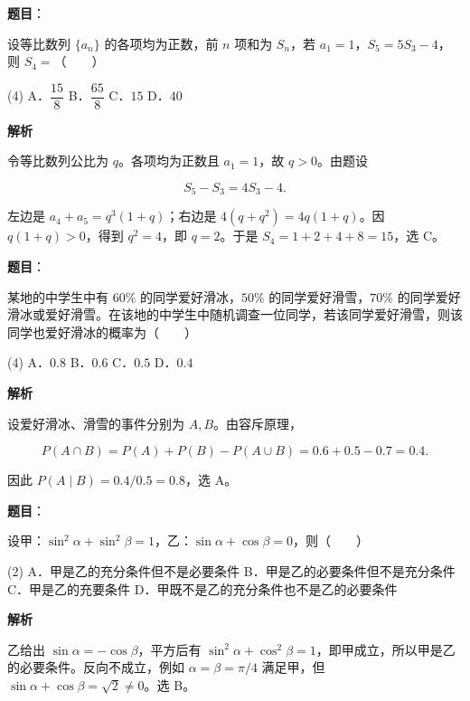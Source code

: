 \begin{answer}

\textbf{题目}：

设等比数列 $\{a_n\}$ 的各项均为正数，前 $n$ 项和为 $S_n$，若 $a_1=1$，$S_5=5S_3-4$，则 $S_4=$\mbox{（　　）}

\begin{gkopts}(4)
\task A．$\dfrac{15}{8}$
\task B．$\dfrac{65}{8}$
\task C．$15$
\task D．$40$
\end{gkopts}

\textbf{解析}

令等比数列公比为 $q$。各项均为正数且 $a_1=1$，故 $q>0$。由题设

\nopagebreak[4]
\[
S_5-S_3=4S_3-4.
\]

左边是 $a_4+a_5=q^3(1+q)$；右边是 $4(q+q^2)=4q(1+q)$。因 $q(1+q)>0$，得到 $q^2=4$，即 $q=2$。于是 $S_4=1+2+4+8=15$，选 C。


\end{answer}
\begin{answer}

\textbf{题目}：

某地的中学生中有 $60\%$ 的同学爱好滑冰，$50\%$ 的同学爱好滑雪，$70\%$ 的同学爱好滑冰或爱好滑雪。在该地的中学生中随机调查一位同学，若该同学爱好滑雪，则该同学也爱好滑冰的概率为\mbox{（　　）}

\begin{gkopts}(4)
\task A．$0.8$
\task B．$0.6$
\task C．$0.5$
\task D．$0.4$
\end{gkopts}

\textbf{解析}

设爱好滑冰、滑雪的事件分别为 $A,B$。由容斥原理，

\nopagebreak[4]
\[
P(A\cap B)=P(A)+P(B)-P(A\cup B)=0.6+0.5-0.7=0.4.
\]

因此 $P(A\mid B)=0.4/0.5=0.8$，选 A。


\end{answer}
\begin{answer}

\textbf{题目}：

设甲：$\sin^2\alpha+\sin^2\beta=1$，乙：$\sin\alpha+\cos\beta=0$，则\mbox{（　　）}

\begin{gkopts}(2)
\task A．甲是乙的充分条件但不是必要条件
\task B．甲是乙的必要条件但不是充分条件
\task C．甲是乙的充要条件
\task D．甲既不是乙的充分条件也不是乙的必要条件
\end{gkopts}

\textbf{解析}

乙给出 $\sin\alpha=-\cos\beta$，平方后有 $\sin^2\alpha+\cos^2\beta=1$，即甲成立，所以甲是乙的必要条件。反向不成立，例如 $\alpha=\beta=\pi/4$ 满足甲，但 $\sin\alpha+\cos\beta=\sqrt2\ne0$。选 B。


\end{answer}
